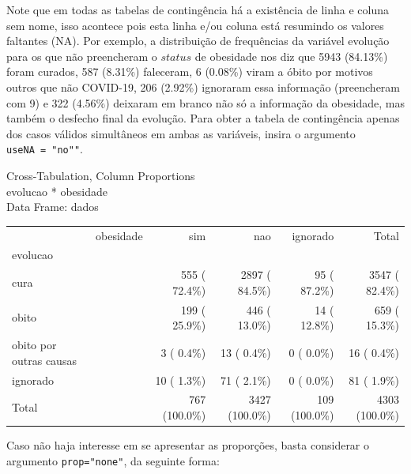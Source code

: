 \documentclass[
  letterpaper,
  DIV=11,
  numbers=noendperiod]{scrreprt}
\newenvironment{Shaded}{\begin{snugshade}}{\end{snugshade}}
\newcommand{\AttributeTok}[1]{\textcolor[rgb]{0.40,0.45,0.13}{#1}}
\newcommand{\FunctionTok}[1]{\textcolor[rgb]{0.28,0.35,0.67}{#1}}
\newcommand{\NormalTok}[1]{\textcolor[rgb]{0.00,0.23,0.31}{#1}}
\newcommand{\SpecialCharTok}[1]{\textcolor[rgb]{0.37,0.37,0.37}{#1}}
\newcommand{\StringTok}[1]{\textcolor[rgb]{0.13,0.47,0.30}{#1}}
\begin{document}
Note que em todas as tabelas de contingência há a existência de linha e
coluna sem nome, isso acontece pois esta linha e/ou coluna está
resumindo os valores faltantes (NA). Por exemplo, a distribuição de
frequências da variável evolução para os que não preencheram o
\(status\) de obesidade nos diz que 5943 (84.13\%) foram curados, 587
(8.31\%) faleceram, 6 (0.08\%) viram a óbito por motivos outros que não
COVID-19, 206 (2.92\%) ignoraram essa informação (preencheram com 9) e
322 (4.56\%) deixaram em branco não só a informação da obesidade, mas
também o desfecho final da evolução. Para obter a tabela de contingência
apenas dos casos válidos simultâneos em ambas as variáveis, insira o
argumento \texttt{useNA\ =\ "no""}.

\begin{Shaded}
\end{Shaded}

Cross-Tabulation, Column Proportions\\
evolucao * obesidade\\
Data Frame: dados

\begin{longtable}[]{@{}lrrrrr@{}}
\toprule()
\endhead
& obesidade & sim & nao & ignorado & Total \\
evolucao & & & & & \\
cura & & 555 ( 72.4\%) & 2897 ( 84.5\%) & 95 ( 87.2\%) & 3547 (
82.4\%) \\
obito & & 199 ( 25.9\%) & 446 ( 13.0\%) & 14 ( 12.8\%) & 659 (
15.3\%) \\
obito por outras causas & & 3 ( 0.4\%) & 13 ( 0.4\%) & 0 ( 0.0\%) & 16 (
0.4\%) \\
ignorado & & 10 ( 1.3\%) & 71 ( 2.1\%) & 0 ( 0.0\%) & 81 ( 1.9\%) \\
Total & & 767 (100.0\%) & 3427 (100.0\%) & 109 (100.0\%) & 4303
(100.0\%) \\
\bottomrule()
\end{longtable}

Caso não haja interesse em se apresentar as proporções, basta considerar
o argumento \texttt{prop="none"}, da seguinte forma:

\begin{Shaded}
\end{Shaded}
\end{document}

